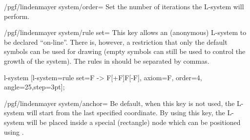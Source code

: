 \begin{key}{/pgf/lindenmayer system/order=}
  Set the number of iterations the L-system will perform.
\end{key}

\begin{key}{/pgf/lindenmayer system/rule set=}
  This key allows an (anonymous) L-system to be declared ``on-line''.
  There is, however, a restriction that only the default symbols can be
  used for drawing (empty symbols can still be used to control
  the growth of the system). The rules in  should
  be separated by commas.
  
\begin{codeexample}[]
\tikz[rotate=65] l-system
  [l-system={rule set={F -> F[+F]F[-F]}, axiom=F, order=4, angle=25,step=3pt}];
\end{codeexample} 
\end{key}

\begin{key}{/pgf/lindenmayer system/anchor=}
  Be default, when this key is not used, the L-system will start from 
  the last specified coordinate. By using this key, the L-system
  will be placed inside a special (rectangle) node which can be
	positioned using .

 
\begin{codeexample}[]
\end{codeexample} 
\end{key}
